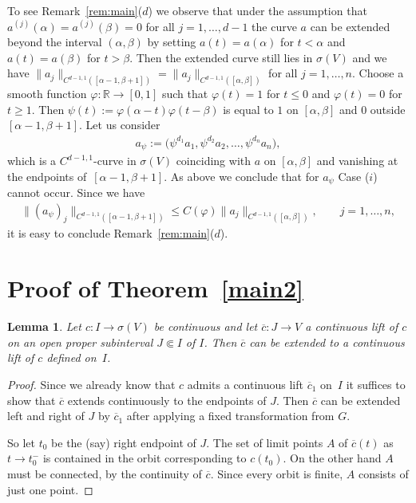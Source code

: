 \documentclass[pdftex]{sigma}
\numberwithin{equation}{section}
\newtheorem{Lemma}[Theorem]{Lemma}
\def\al{\alpha}
\def\be{\beta}
\def\si{\sigma}
\def\vh{\varphi}
\def\ps{\psi}
\def\R{\mathbb{R}}
\def\ol{\overline}
\begin{document}
To see Remark~\ref{rem:main}($d$) we observe that under the assumption that $a^{(j)}(\al) = a^{(j)}(\be) = 0$ for all
$j= 1,\dots,d-1$ the curve $a$ can be extended beyond the interval $(\al,\be)$ by setting $a(t) = a(\al)$ for
$t<\al$ and $a(t) = a(\be)$ for $t>\be$. Then the extended curve still lies in $\si(V)$ and we have
$\|a_j\|_{C^{d-1,1}([\al -1,\be +1])} = \|a_j\|_{C^{d-1,1}([\al,\be])}$ for all $j =1,\dots,n$.
Choose a smooth function $\vh \colon \R \to [0,1]$ such that $\vh(t)=1$ for $t \le 0$ and $\vh(t)=0$ for $t\ge 1$.
Then $\ps(t):= \vh(\al-t)\vh(t-\be)$ is equal to $1$ on $[\al,\be]$ and $0$ outside $[\al-1,\be+1]$.
Let us consider
\begin{gather*}
 a_\ps := \big(\ps^{d_1} a_1,\ps^{d_2} a_2,\dots,\ps^{d_n} a_n\big),
\end{gather*}
which is a $C^{d-1,1}$-curve in $\si(V)$ coinciding with $a$ on $[\al,\be]$ and vanishing at the
endpoints of~$[\al-1,\be+1]$.
As above we conclude that for $a_\ps$ Case ($i$) cannot occur. Since we have
\begin{gather*}
 \|(a_\ps)_j\|_{C^{d-1,1}([\al -1,\be +1])} \le C(\vh) \|a_j\|_{C^{d-1,1}([\al,\be])}, \qquad
 j =1,\dots,n,
\end{gather*}
it is easy to conclude Remark~\ref{rem:main}($d$).






\section{Proof of \texorpdfstring{Theorem~\ref{main2}}{Theorem 1.3}} %

\begin{Lemma} \label{lem:1}
 Let $c \colon I \to \si(V)$ be continuous and let $\ol c \colon J \to V$ a continuous lift of $c$
 on an open proper subinterval $J \Subset I$ of $I$.
 Then $\ol c$ can be extended to a continuous lift of $c$ defined on~$I$.
\end{Lemma}

\begin{proof}
 Since we already know that $c$ admits a continuous lift $\ol c_1$ on~$I$ it suffices to show
 that $\ol c$ extends continuously to the endpoints of $J$. Then $\ol c$ can be extended left and
 right of $J$ by $\ol c_1$ after applying a fixed transformation from $G$.

 So let $t_0$ be the (say) right endpoint of $J$. The set of limit points $A$ of $\ol c(t)$ as $t \to t_0^-$
 is contained in the orbit corresponding to $c(t_0)$. On the other hand $A$ must be connected, by the continuity of $\ol c$.
 Since every orbit is finite, $A$ consists of just one point.
\end{proof}
\end{document}
